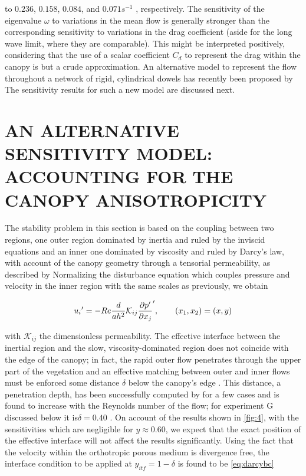 to $0.236$, $0.158$, $0.084$, and $0.071 s^{-1}$ , respectively. The sensitivity of the eigenvalue $\omega$ to variations
in the mean flow is generally stronger than the corresponding sensitivity to variations in the drag
coefficient (aside for the long wave limit, where they are comparable). This might be interpreted
positively, considering that the use of a scalar coefficient $C_d$ to represent the drag within the canopy
is but a crude approximation. An alternative model to represent the flow throughout a network of
rigid, cylindrical dowels has recently been proposed by \cite{zampogna2016instability} The sensitivity results for
such a new model are discussed next.


\section{AN ALTERNATIVE SENSITIVITY MODEL: ACCOUNTING FOR THE CANOPY ANISOTROPICITY}
\label{sec:4}

The stability problem in this section is based on the coupling between two regions, one outer
region dominated by inertia and ruled by the inviscid equations and an inner one dominated by
viscosity and ruled by Darcy’s law, with account of the canopy geometry through a tensorial
permeability, as described by \cite{zampogna2016instability} Normalizing the disturbance equation which couples
pressure and velocity in the inner region with the same scales as previously, we obtain

\begin{equation}
{u_i}' = -Re \dfrac{d}{ah^2} \mathcal{K}_{ij} \dfrac{\partial p'}{\partial {}x_j}',  \qquad (x_1, x_2) = (x,y)
\label{eq:darcy}
\end{equation}


with $\mathcal{K}_{ij}$ the dimensionless permeability. The effective interface between the inertial region and the
slow, viscosity-dominated region does not coincide with the edge of the canopy; in fact, the rapid
outer flow penetrates through the upper part of the vegetation and an effective matching between
outer and inner flows must be enforced some distance $\delta$ below the canopy’s edge \cite{le2006interfacial}.  This distance,
a penetration depth, has been successfully computed by \cite{zampogna2016fluid} for a few cases
and is found to increase with the Reynolds number of the flow; for experiment G discussed below it
is$ \delta = 0.40$ \cite{zampognaprivate}. On account of the results shown in \ref{fig:4}, with the sensitivities which are negligible
for $y \approx 0.60$, we expect that the exact position of the effective interface will not affect the results
significantly.
Using the fact that the velocity within the orthotropic porous medium is divergence free, the
interface condition to be applied at $y_{itf} = 1 - \delta$ is found to be \ref{eq:darcybc}

